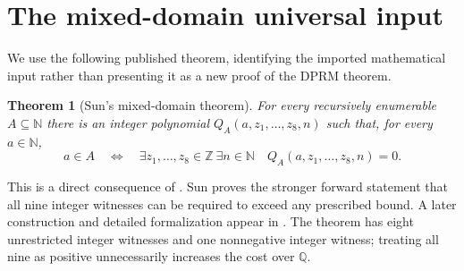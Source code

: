 \documentclass[11pt,a4paper]{article}
\newtheorem{theorem}{Theorem}[section]
\newcommand{\Q}{\mathbb Q}\newcommand{\Z}{\mathbb Z}\newcommand{\N}{\mathbb N}
\begin{document}
\section{The mixed-domain universal input}
We use the following published theorem, identifying the imported mathematical
input rather than presenting it as a new proof of the DPRM theorem.

\begin{theorem}[Sun's mixed-domain theorem]\label{sun}
For every recursively enumerable $A\subseteq\N$ there is an integer polynomial
$Q_A(a,z_1,\ldots,z_8,n)$ such that, for every $a\in\N$,
\[
 a\in A\quad\Longleftrightarrow\quad
 \exists z_1,\ldots,z_8\in\Z\ \exists n\in\N\quad
 Q_A(a,z_1,\ldots,z_8,n)=0.
\]
\end{theorem}
This is a direct consequence of \cite[Theorem 1.1(i), equations (1.2)--(1.3)]{Sun}.
Sun proves the stronger forward statement that all nine integer witnesses can
be required to exceed any prescribed bound. A later construction and detailed
formalization appear in \cite[Theorem 3 and Definition 5.3]{BDHMS}. The theorem
has eight unrestricted integer witnesses and one nonnegative integer witness;
treating all nine as positive unnecessarily increases the cost over $\Q$.
\end{document}
